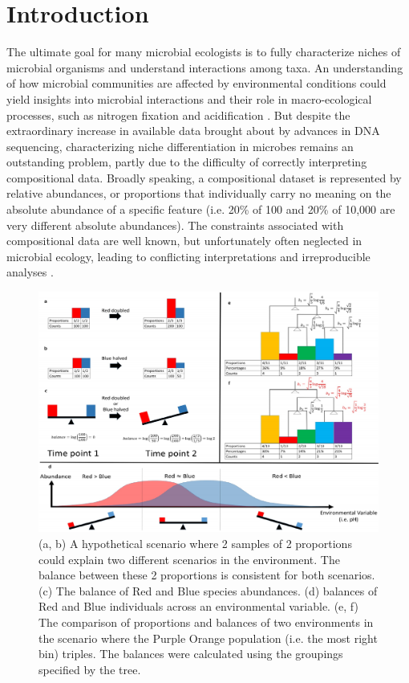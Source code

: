 \section{Introduction}
The ultimate goal for many microbial ecologists is to fully characterize niches of microbial organisms and understand interactions among taxa.  An understanding of how microbial communities are affected by environmental conditions could yield insights into microbial interactions and their role in macro-ecological processes, such as nitrogen fixation \cite{nitrogen_fixation} and acidification \cite{global_patterns}. But despite the extraordinary increase in available data brought about by advances in DNA sequencing, characterizing niche differentiation in microbes remains an outstanding problem, partly due to the difficulty of correctly interpreting compositional data.  Broadly speaking, a compositional dataset is represented by relative abundances, or proportions that individually carry no meaning on the absolute abundance of a specific feature (i.e. 20\% of 100 and 20\% of 10,000 are very different absolute abundances).  The constraints associated with compositional data are well known, but unfortunately often neglected in microbial ecology, leading to conflicting interpretations and irreproducible analyses \cite{gloor_epi} \cite{fodor_coda} .\par
\begin{figure}[H]
        \centering
        \includegraphics[width=1\textwidth]{ch3/Figure1.pdf}
        \caption[An explanation of balances and how to interpret them.]
        {(a, b) A hypothetical scenario where 2 samples of 2 proportions could explain two different scenarios in the environment.  The balance between these 2 proportions is consistent for both scenarios.  (c) The balance of Red and Blue species abundances.  (d) balances of Red and Blue individuals across an environmental variable.  (e, f) The comparison of proportions and balances of two environments in the scenario where the Purple Orange population (i.e. the most right bin) triples. The balances were calculated using the groupings specified by the tree.}
        \label{figc1}
\end{figure}

